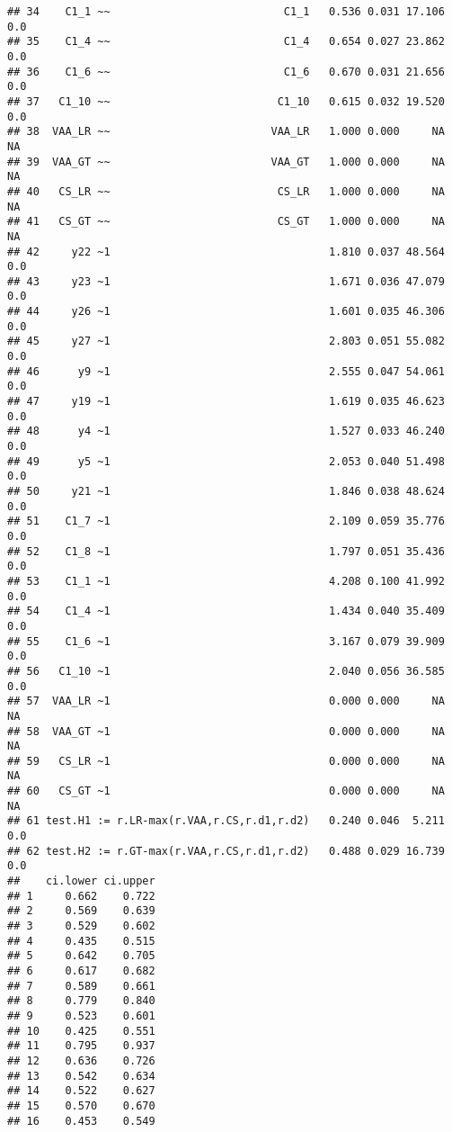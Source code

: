 \documentclass[
]{article}
\begin{document}
\begin{verbatim}
## 34    C1_1 ~~                           C1_1   0.536 0.031 17.106    0.0
## 35    C1_4 ~~                           C1_4   0.654 0.027 23.862    0.0
## 36    C1_6 ~~                           C1_6   0.670 0.031 21.656    0.0
## 37   C1_10 ~~                          C1_10   0.615 0.032 19.520    0.0
## 38  VAA_LR ~~                         VAA_LR   1.000 0.000     NA     NA
## 39  VAA_GT ~~                         VAA_GT   1.000 0.000     NA     NA
## 40   CS_LR ~~                          CS_LR   1.000 0.000     NA     NA
## 41   CS_GT ~~                          CS_GT   1.000 0.000     NA     NA
## 42     y22 ~1                                  1.810 0.037 48.564    0.0
## 43     y23 ~1                                  1.671 0.036 47.079    0.0
## 44     y26 ~1                                  1.601 0.035 46.306    0.0
## 45     y27 ~1                                  2.803 0.051 55.082    0.0
## 46      y9 ~1                                  2.555 0.047 54.061    0.0
## 47     y19 ~1                                  1.619 0.035 46.623    0.0
## 48      y4 ~1                                  1.527 0.033 46.240    0.0
## 49      y5 ~1                                  2.053 0.040 51.498    0.0
## 50     y21 ~1                                  1.846 0.038 48.624    0.0
## 51    C1_7 ~1                                  2.109 0.059 35.776    0.0
## 52    C1_8 ~1                                  1.797 0.051 35.436    0.0
## 53    C1_1 ~1                                  4.208 0.100 41.992    0.0
## 54    C1_4 ~1                                  1.434 0.040 35.409    0.0
## 55    C1_6 ~1                                  3.167 0.079 39.909    0.0
## 56   C1_10 ~1                                  2.040 0.056 36.585    0.0
## 57  VAA_LR ~1                                  0.000 0.000     NA     NA
## 58  VAA_GT ~1                                  0.000 0.000     NA     NA
## 59   CS_LR ~1                                  0.000 0.000     NA     NA
## 60   CS_GT ~1                                  0.000 0.000     NA     NA
## 61 test.H1 := r.LR-max(r.VAA,r.CS,r.d1,r.d2)   0.240 0.046  5.211    0.0
## 62 test.H2 := r.GT-max(r.VAA,r.CS,r.d1,r.d2)   0.488 0.029 16.739    0.0
##    ci.lower ci.upper
## 1     0.662    0.722
## 2     0.569    0.639
## 3     0.529    0.602
## 4     0.435    0.515
## 5     0.642    0.705
## 6     0.617    0.682
## 7     0.589    0.661
## 8     0.779    0.840
## 9     0.523    0.601
## 10    0.425    0.551
## 11    0.795    0.937
## 12    0.636    0.726
## 13    0.542    0.634
## 14    0.522    0.627
## 15    0.570    0.670
## 16    0.453    0.549

\end{verbatim}
\end{document}
